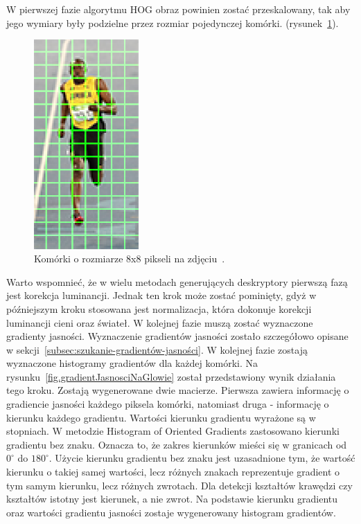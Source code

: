 \documentclass[a4paper,twoside,12pt]{book}
\begin{document}
    W pierwszej fazie algorytmu HOG obraz powinien zostać przeskalowany, tak aby jego wymiary były podzielne przez
    rozmiar
    pojedynczej komórki.
    (rysunek~\ref{fig.komorkiHoga}).
    \begin{figure}
        \centering
        \includegraphics[width=4cm]{Obrazy/komorkiHoga.jpg}
        \caption{Komórki o rozmiarze 8x8 pikseli na zdjęciu~\cite{hogOpenCv}.}
        \label{fig.komorkiHoga}
    \end{figure}
    Warto wspomnieć, że w wielu metodach generujących deskryptory pierwszą fazą jest korekcja luminancji.
    Jednak ten krok może zostać pominięty, gdyż w późniejszym kroku stosowana jest normalizacja,
    która dokonuje korekcji luminancji cieni oraz świateł.
    W kolejnej fazie muszą zostać wyznaczone gradienty jasności.
    Wyznaczenie gradientów jasności zostało szczegółowo opisane w sekcji~\ref{subsec:szukanie-gradientów-jasności}.
    W kolejnej fazie zostają wyznaczone histogramy gradientów dla każdej komórki.
    Na rysunku~\ref{fig.gradientJasnosciNaGlowie} został przedstawiony wynik działania tego kroku.
    Zostają wygenerowane dwie macierze. Pierwsza zawiera informację o gradiencie jasności każdego piksela komórki,
    natomiast druga - informację o kierunku każdego gradientu.
    Wartości kierunku gradientu wyrażone są w stopniach. W metodzie Histogram of Oriented Gradients
    zastosowano kierunki gradientu bez znaku. Oznacza to, że zakres kierunków mieści się w granicach
    od $0^{\circ}$ do $180^{\circ}$.
    Użycie kierunku gradientu bez znaku jest uzasadnione tym,
    że wartość kierunku o takiej samej wartości, lecz różnych znakach reprezentuje gradient o tym samym kierunku, lecz
    różnych zwrotach. Dla detekcji kształtów krawędzi czy kształtów istotny jest kierunek, a nie zwrot.
    Na podstawie kierunku gradientu oraz wartości gradientu jasności zostaje wygenerowany histogram gradientów.
\end{document}

